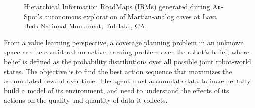 \documentclass[letterpaper]{article} %
\begin{document}
\begin{figure}[t!]
\centering
  \caption{Hierarchical Information RoadMaps (IRMs) generated during Au-Spot's autonomous exploration of Martian-analog caves at Lava Beds National Monument, Tulelake, CA.} \label{fig:IRMs} 
\end{figure}



From a value learning perspective, a coverage planning problem in an unknown space can be considered an active learning problem over the robot's belief, where belief is defined as the probability distributions over all possible joint robot-world states.
%
The objective is to find the best action sequence that maximizes the accumulated reward over time.  The agent must accumulate data to incrementally build a model of its environment, and need to understand the effects of its actions on the quality and quantity of data it collects.
\end{document}
